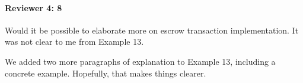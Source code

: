 \documentclass[9pt]{article}
\begin{document}
\begin{multicols*}{2}
\paragraph{Reviewer 4: 8}
\begin{feedback}
  Would it be possible to elaborate more on escrow transaction implementation.
  It was not clear to me from Example 13.
\end{feedback}
We added two more paragraphs of explanation to Example 13, including a concrete
example. Hopefully, that makes things clearer.



\end{multicols*}
\end{document}
